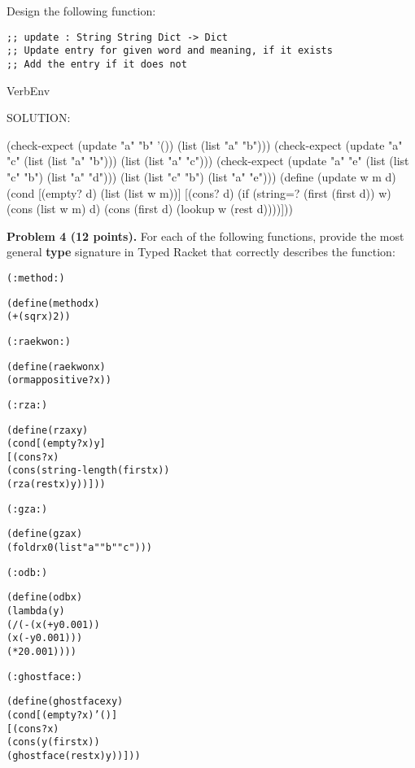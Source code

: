 \documentclass[12pt]{article}
\begin{document}
\noindent
Design the following function:

\begin{verbatim}
;; update : String String Dict -> Dict
;; Update entry for given word and meaning, if it exists
;; Add the entry if it does not
\end{verbatim}

\begin{SaveVerbatim}{VerbEnv}

SOLUTION:

(check-expect (update "a" "b" '()) (list (list "a" "b")))
(check-expect (update "a" "c" (list (list "a" "b")))
              (list (list "a" "c")))
(check-expect (update "a" "e" (list (list "c" "b") (list "a" "d"))) 
              (list (list "c" "b") (list "a" "e")))
(define (update w m d)
  (cond [(empty? d) (list (list w m))]
        [(cons? d)
         (if (string=? (first (first d)) w)
             (cons (list w m) d)
             (cons (first d) (lookup w (rest d))))]))

\end{SaveVerbatim}


\newpage

\noindent
{\bf Problem 4 (12 points).}
%
For each of the following functions, provide the most general {\bf type} signature
in Typed Racket that correctly describes the function:

\begin{alltt}
(: method : )

(define (method x)
  (+ (sqr x) 2))

(: raekwon : )

(define (raekwon x)
  (ormap positive? x))

(: rza : )

(define (rza x y)
  (cond [(empty? x) y]
        [(cons? x)
         (cons (string-length (first x))
               (rza (rest x) y))]))

(: gza : )

(define (gza x)
  (foldr x 0 (list "a" "b" "c")))

(: odb : )

(define (odb x)
  (lambda (y)   
    (/ (- (x (+ y 0.001))
          (x (- y 0.001)))
       (* 2 0.001))))
    

(: ghostface : \censor{[X Y] [Listof X] [X -> Y] -> [Listof Y]          })

(define (ghostface x y)
  (cond [(empty? x) '()]
        [(cons? x)
         (cons (y (first x)) 
               (ghostface (rest x) y))]))
\end{alltt}
\end{document}
